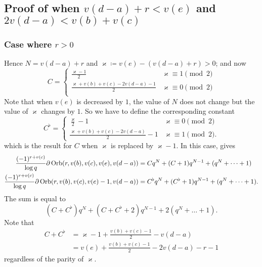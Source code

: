 \subsection{Proof of 
  when $v(d-a)+r < v(e)$ and $2v(d-a) < v(b)+v(c)$}
\subsubsection{Case where $r > 0$}
Hence $N = v(d-a) + r$ and $\varkappa \coloneqq v(e) - (v(d-a)+r) > 0$; and now
\[
  C = \begin{cases}
    \frac{\varkappa-1}{2} & \varkappa \equiv 1 \pmod 2\\
    \frac{\varkappa+v(b)+v(c)-2v(d-a)-1}{2} & \varkappa \equiv 0 \pmod 2 \\
  \end{cases}
\]
Note that when $v(e)$ is decreased by $1$,
the value of $N$ does not change but the value of $\varkappa$ changes by $1$.
So we have to define the corresponding constant
\[
  C^\flat = \begin{cases}
    \frac{\varkappa}{2}-1 & \varkappa \equiv 0 \pmod 2\\
    \frac{\varkappa+v(b)+v(c)-2v(d-a)}{2}-1 & \varkappa \equiv 1 \pmod 2.
  \end{cases}
\]
which is the result for $C$ when $\varkappa$ is replaced by $\varkappa-1$.
In this case,  gives
\begin{align*}
  \frac{(-1)^{r+v(c)}}{\log q}\partial\operatorname{Orb}(r, v(b), v(c), v(e), v(d-a))
  &= C q^N + (C+1) q^{N-1} + (q^N + \dots + 1) \\
  \frac{(-1)^{r+v(c)}}{\log q}\partial\operatorname{Orb}(r, v(b), v(c), v(e)-1, v(d-a))
  &= C^\flat q^N + (C^\flat+1) q^{N-1} + (q^N + \dots + 1).
\end{align*}
The sum is equal to
\[ (C + C^\flat) q^N + (C+C^\flat+2) q^{N-1} + 2(q^N + \dots + 1). \]
Note that
\begin{align*}
  C + C^\flat
  &= \varkappa - 1 + \frac{v(b)+v(c)-1}{2} - v(d-a) \\
  &= v(e) + \frac{v(b)+v(c)-1}{2} - 2v(d-a) - r - 1
\end{align*}
regardless of the parity of $\varkappa$.

